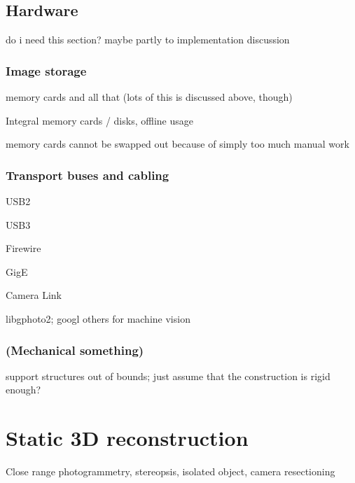 \subsection{Hardware} %

do i need this section? maybe partly to implementation discussion

\subsubsection{Image storage}

memory cards and all that (lots of this is discussed above, though)

Integral memory cards / disks, offline usage

memory cards cannot be swapped out because of simply too much manual work

\subsubsection{Transport buses and cabling}

USB2

USB3

Firewire

GigE

Camera Link

libgphoto2; googl others for machine vision

\subsubsection{(Mechanical something)}

support structures out of bounds; just assume that the construction is rigid enough?


\clearpage
\section{Static 3D reconstruction}





Close range photogrammetry, stereopsis, isolated object, camera resectioning


